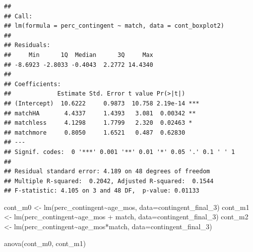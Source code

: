 \documentclass[
]{article}
\newenvironment{Shaded}{\begin{snugshade}}{\end{snugshade}}
\newcommand{\AttributeTok}[1]{\textcolor[rgb]{0.77,0.63,0.00}{#1}}
\newcommand{\CommentTok}[1]{\textcolor[rgb]{0.56,0.35,0.01}{\textit{#1}}}
\newcommand{\FunctionTok}[1]{\textcolor[rgb]{0.00,0.00,0.00}{#1}}
\newcommand{\NormalTok}[1]{#1}
\newcommand{\OtherTok}[1]{\textcolor[rgb]{0.56,0.35,0.01}{#1}}
\newcommand{\SpecialCharTok}[1]{\textcolor[rgb]{0.00,0.00,0.00}{#1}}
\newcommand{\StringTok}[1]{\textcolor[rgb]{0.31,0.60,0.02}{#1}}
\begin{document}
\begin{Shaded}
\end{Shaded}

\begin{verbatim}
## 
## Call:
## lm(formula = perc_contingent ~ match, data = cont_boxplot2)
## 
## Residuals:
##     Min      1Q  Median      3Q     Max 
## -8.6923 -2.8033 -0.4043  2.2772 14.4340 
## 
## Coefficients:
##             Estimate Std. Error t value Pr(>|t|)    
## (Intercept)  10.6222     0.9873  10.758 2.19e-14 ***
## matchHA       4.4337     1.4393   3.081  0.00342 ** 
## matchless     4.1298     1.7799   2.320  0.02463 *  
## matchmore     0.8050     1.6521   0.487  0.62830    
## ---
## Signif. codes:  0 '***' 0.001 '**' 0.01 '*' 0.05 '.' 0.1 ' ' 1
## 
## Residual standard error: 4.189 on 48 degrees of freedom
## Multiple R-squared:  0.2042, Adjusted R-squared:  0.1544 
## F-statistic: 4.105 on 3 and 48 DF,  p-value: 0.01133
\end{verbatim}

\begin{Shaded}
\begin{Highlighting}[]
\NormalTok{cont\_m0 }\OtherTok{\textless{}{-}} \FunctionTok{lm}\NormalTok{(perc\_contingent}\SpecialCharTok{\textasciitilde{}}\NormalTok{age\_mos, }\AttributeTok{data=}\NormalTok{contingent\_final\_3) }
\NormalTok{cont\_m1 }\OtherTok{\textless{}{-}} \FunctionTok{lm}\NormalTok{(perc\_contingent}\SpecialCharTok{\textasciitilde{}}\NormalTok{age\_mos }\SpecialCharTok{+}\NormalTok{ match, }\AttributeTok{data=}\NormalTok{contingent\_final\_3) }
\NormalTok{cont\_m2 }\OtherTok{\textless{}{-}} \FunctionTok{lm}\NormalTok{(perc\_contingent}\SpecialCharTok{\textasciitilde{}}\NormalTok{age\_mos}\SpecialCharTok{*}\NormalTok{match, }\AttributeTok{data=}\NormalTok{contingent\_final\_3) }

\FunctionTok{anova}\NormalTok{(cont\_m0, cont\_m1)}
\end{Highlighting}
\end{Shaded}
\end{document}
